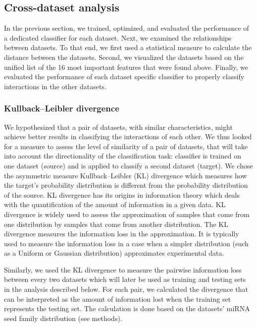 \documentclass{bmcart}
\begin{document}
\subsection*{Cross-dataset analysis}
In the previous section, we trained, optimized, and evaluated the performance of a dedicated classifier for each dataset. Next, we examined the relationships between datasets. To that end, we first used a statistical measure to calculate the distance between the datasets. Second, we visualized the datasets based on the unified list of the 16 most important features that were found above. Finally, we evaluated the performance of each dataset specific classifier to properly classify interactions in the other datasets.

\subsubsection*{Kullback–Leibler divergence}
We hypothesized that a pair of datasets, with similar characteristics, might achieve better results in classifying the interactions of each other. We thus looked for a measure to assess the level of similarity of a pair of datasets, that will take into account the directionality of the classification task: classifier is trained on one dataset (source) and is applied to classify a second dataset (target).
We chose the asymmetric measure Kullback–Leibler (KL) divergence which measures how the target's probability distribution is different from the probability distribution of the source. KL divergence has its origins in information theory which deals with the quantification of the amount of information in a given data. KL divergence is widely used to assess the approximation of samples that come from one distribution by samples that come from another distribution. The KL divergence measures the information loss in the approximation. It is typically used to measure the information loss in a case when a simpler distribution (such as a Uniform or Gaussian distribution) approximates experimental data.

Similarly, we used the KL divergence to measure the pairwise information loss between every two datasets which will later be used as training and testing sets in the analysis described below. For each pair, we calculated the divergence that can be interpreted as the amount of information lost when the training set represents the testing set. The calculation is done based on the datasets' miRNA seed family distribution (see methods).
\end{document}
